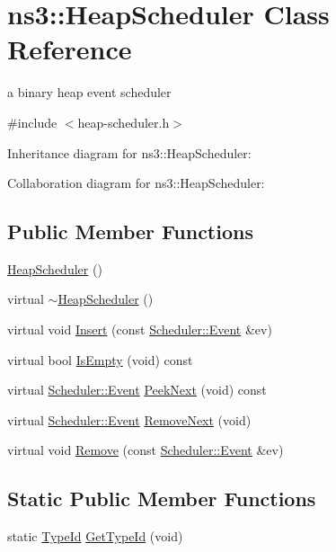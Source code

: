 \hypertarget{classns3_1_1HeapScheduler}{}\section{ns3\+:\+:Heap\+Scheduler Class Reference}
\label{classns3_1_1HeapScheduler}


a binary heap event scheduler  




{\ttfamily \#include $<$heap-\/scheduler.\+h$>$}



Inheritance diagram for ns3\+:\+:Heap\+Scheduler\+:


Collaboration diagram for ns3\+:\+:Heap\+Scheduler\+:
\subsection*{Public Member Functions}
\begin{DoxyCompactItemize}
\item 
\hyperlink{classns3_1_1HeapScheduler_a16c95b81c77ed0139be113ac2e6e7e13}{Heap\+Scheduler} ()
\item 
virtual \hyperlink{classns3_1_1HeapScheduler_a819ab6e564272f11360b91f2ff7f1202}{$\sim$\+Heap\+Scheduler} ()
\item 
virtual void \hyperlink{classns3_1_1HeapScheduler_ac30b67c69e468683bfc7e32f71bfc152}{Insert} (const \hyperlink{structns3_1_1Scheduler_1_1Event}{Scheduler\+::\+Event} \&ev)
\item 
virtual bool \hyperlink{classns3_1_1HeapScheduler_a7299577be6a009c7ca718bfd26f2ff31}{Is\+Empty} (void) const 
\item 
virtual \hyperlink{structns3_1_1Scheduler_1_1Event}{Scheduler\+::\+Event} \hyperlink{classns3_1_1HeapScheduler_a103fb21c3f2baa2f908516e831a3e674}{Peek\+Next} (void) const 
\item 
virtual \hyperlink{structns3_1_1Scheduler_1_1Event}{Scheduler\+::\+Event} \hyperlink{classns3_1_1HeapScheduler_a97e15b27a21ddedd4346d66b21d97144}{Remove\+Next} (void)
\item 
virtual void \hyperlink{classns3_1_1HeapScheduler_a81d475b379794f8c4f257d7a506ac372}{Remove} (const \hyperlink{structns3_1_1Scheduler_1_1Event}{Scheduler\+::\+Event} \&ev)
\end{DoxyCompactItemize}
\subsection*{Static Public Member Functions}
\begin{DoxyCompactItemize}
\item 
static \hyperlink{classns3_1_1TypeId}{Type\+Id} \hyperlink{classns3_1_1HeapScheduler_a2b7af8a7c1a573488d9f7ccb4ad10cae}{Get\+Type\+Id} (void)
\end{DoxyCompactItemize}

